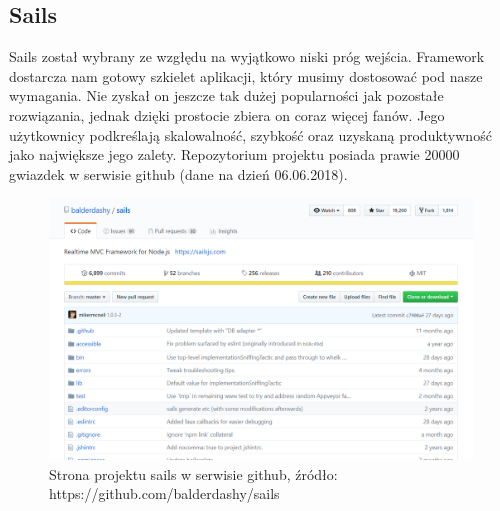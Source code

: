\documentclass[12pt]{report}
\begin{document}
    \subsection{Sails}
      Sails został wybrany ze wzgłędu na wyjątkowo niski próg wejścia.
      Framework dostarcza nam gotowy szkielet aplikacji, który musimy dostosować pod nasze wymagania.
      Nie zyskał on jeszcze tak dużej popularności jak pozostałe rozwiązania, jednak dzięki prostocie zbiera on coraz więcej fanów.
      Jego użytkownicy podkreślają skalowalność, szybkość oraz uzyskaną produktywność jako największe jego zalety.
      Repozytorium projektu posiada prawie 20000 gwiazdek w serwisie github (dane na dzień 06.06.2018).
      \begin{figure}[!hb]
        \centering
        \includegraphics[width=\textwidth,height=\textheight,keepaspectratio]{sails.png} 
        \caption{Strona projektu sails w serwisie github, źródło: https://github.com/balderdashy/sails}
      \end{figure}
\end{document}
